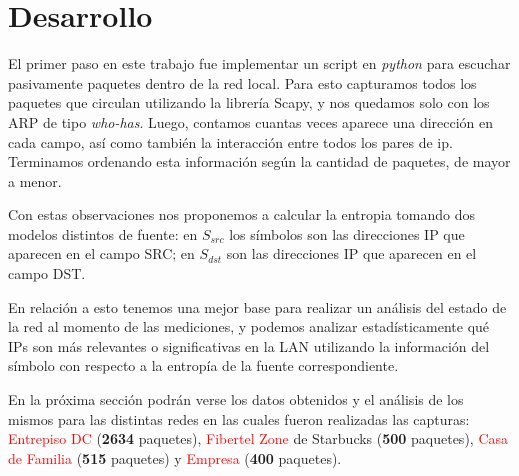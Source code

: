 \section{Desarrollo}

El primer paso en este trabajo fue implementar un script en \emph{python} 
para escuchar pasivamente paquetes dentro de la red local. Para esto capturamos
todos los paquetes que circulan utilizando la librería Scapy, y nos quedamos 
solo con los ARP de tipo \emph{who-has}. Luego, contamos cuantas veces aparece
una direcci\'on en cada campo, as\'i como tambi\'en la interacci\'on entre
todos los pares de ip. Terminamos ordenando esta información según la
cantidad de paquetes, de mayor a menor.

Con estas observaciones nos proponemos a calcular la entropia tomando dos 
modelos distintos de fuente: en \textbf{$S_{src}$} los símbolos son las
direcciones IP que aparecen en el campo SRC; en \textbf{$S_{dst}$} son las
direcciones IP que aparecen en el campo DST.

En relación a esto tenemos una mejor base para realizar un análisis del estado de 
la red al momento de las mediciones, y podemos analizar estadísticamente qué IPs 
son más relevantes o significativas en la LAN utilizando la información del símbolo 
con respecto a la entropía de la fuente correspondiente.


En la próxima sección podrán verse los datos obtenidos y el análisis de los mismos
para las distintas redes en las cuales fueron realizadas las capturas: 
\textcolor{red}{Entrepiso DC} (\textbf{2634} paquetes), \textcolor{red}{Fibertel Zone} de Starbucks (\textbf{500} paquetes),
\textcolor{red}{Casa de Familia} (\textbf{515} paquetes) y \textcolor{red}{Empresa} (\textbf{400} paquetes).



